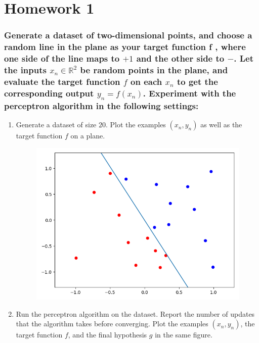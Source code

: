 \documentclass[12pt,letterpaper]{article}
\begin{document}
\section*{Homework 1}

\subsubsection*{Generate a dataset of two-dimensional points, and choose a random line in the plane as your target function f , where one side of the line maps to $+1$ and the other side to $−$. Let the inputs $x_n\in \mathbb{R}^2$ be random points in the plane, and evaluate the target function $f$ on each $x_n$ to get the corresponding output $y_n = f(x_n)$.
Experiment with the perceptron algorithm in the following settings:}
\begin{enumerate}[leftmargin=!,labelindent=5pt]
    \item Generate a dataset of size $20$. Plot the examples ${(x_n, y_n)}$ as well as the target function $f$ on a plane.
        \begin{figure}[H]
            \centering
            \includegraphics[width=15cm]{images/firstplot.png}
            \caption{}
            \label{fig:1}
        \end{figure}
    \newpage
    \item Run the perceptron algorithm on the dataset. Report the number of updates that the algorithm takes before converging. Plot the examples ${(x_n, y_n)}$, the target function $f$, and the final hypothesis $g$ in the same figure.
        \begin{figure}[H]

\end{figure}
\end{enumerate}
\end{document}
